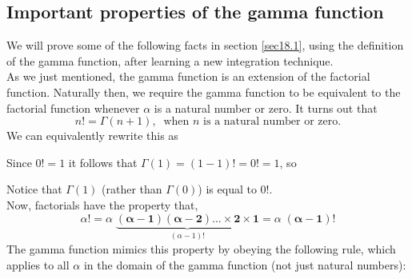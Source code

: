 \subsection{Important properties of the gamma function} \label{gamma properties}
\noindent We will prove some of the following facts in section \ref{sec18.1}, using the definition of the gamma function, after learning a new integration technique.  \\

\noindent As we just mentioned, the gamma function is an extension of the factorial function. Naturally then, we require the gamma function to be equivalent to the factorial function whenever $\alpha$ is a natural number or zero. It turns out that
\[
n! = \Gamma(n + 1), \;\; \text{when $n$ is a natural number or zero}. 
\]   
We can equivalently rewrite this as

  	\bigskip
	
	\hfil{}
	\bigskip

\noindent Since $0! = 1$ it follows that $\Gamma(1) = (1 - 1)! = 0! = 1$, so

  	\bigskip
	
	\hfil{}
	\bigskip

\noindent Notice that $\Gamma(1)$ (rather than $\Gamma(0)$) is equal to $0!$.  \\

\noindent Now, factorials have the property that,
\[
\alpha! = \alpha\; \underbrace{\boldsymbol{(\alpha-1)(\alpha - 2)\ldots\times2\times1}}_{(\alpha - 1)!} = \alpha\;\boldsymbol{(\alpha-1)!}
\]
The gamma function mimics this property by obeying the following rule, which applies to all $\alpha$ in the domain of the gamma function (not just natural numbers):

  	\bigskip
	
	\hfil{}
	\bigskip

